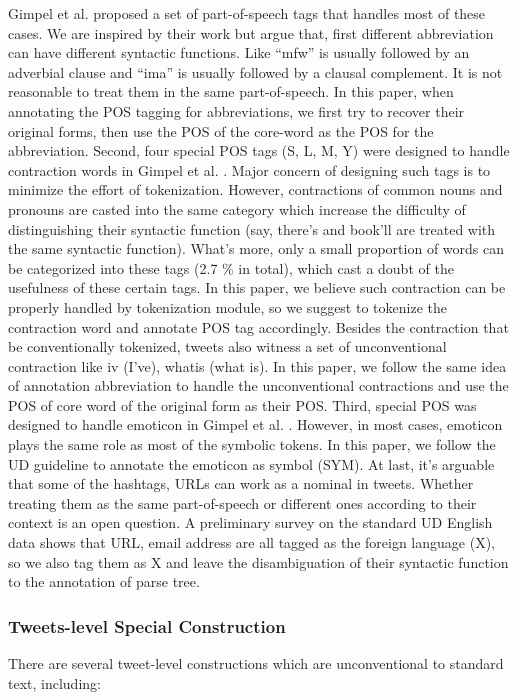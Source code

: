 \documentclass[11pt,letterpaper]{article}
\begin{document}
Gimpel et al.  proposed a set of part-of-speech tags that handles most of these cases. 
We are inspired by their work but argue that, first different abbreviation can have different syntactic functions. 
Like “mfw” is usually followed by an adverbial clause and “ima” is usually followed by a clausal complement. 
It is not reasonable to treat them in the same part-of-speech. 
In this paper, when annotating the POS tagging for abbreviations, we first try to recover their original forms, then use the POS of the core-word as the POS for the abbreviation.
Second, four special POS tags (S, L, M, Y) were designed to handle contraction words in Gimpel et al. . Major concern of designing such tags is to minimize the effort of tokenization. 
However, contractions of common nouns and pronouns are casted into the same category which increase the difficulty of distinguishing their syntactic function (say, there's and book'll are treated with the same syntactic function). What's more, only a small proportion of words can be categorized into these tags (2.7 \% in total), which cast a doubt of the usefulness of these certain tags. In this paper, we believe such contraction can be properly handled by tokenization module, so we suggest to tokenize the contraction word and annotate POS tag accordingly.
Besides the contraction that be conventionally tokenized, tweets also witness a set of unconventional contraction like iv (I've), whatis (what is). In this paper, we follow the same idea of annotation abbreviation to handle the unconventional contractions and use the POS of core word of the original form as their POS.
Third, special POS was designed to handle emoticon in Gimpel et al. . However, in most cases, emoticon plays the same role as most of the symbolic tokens. In this paper, we follow the UD guideline to annotate the emoticon as symbol (SYM).
At last, it’s arguable that some of the hashtags, URLs can work as a nominal in tweets. Whether treating them as the same part-of-speech or different ones according to their context is an open question. A preliminary survey on the standard UD English data shows that URL, email address are all tagged as the foreign language (X), so we also tag them as X and leave the disambiguation of their syntactic function to the annotation of parse tree.

\subsubsection{Tweets-level Special Construction}
There are several tweet-level constructions which are unconventional to standard text, including:
\end{document}
